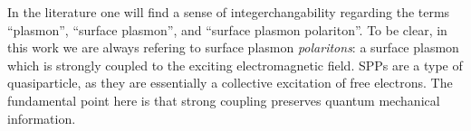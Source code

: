 In the literature one will find a sense of integerchangability regarding
the terms ``plasmon'', ``surface plasmon'', and ``surface plasmon
polariton''.  To be clear, in this work we are always refering to surface
plasmon \textit{polaritons}: a surface plasmon which is strongly coupled to
the exciting electromagnetic field.  SPPs are a type of
quasiparticle, as they are essentially a collective excitation of free
electrons.  The fundamental point here is that strong coupling
preserves quantum mechanical information.
